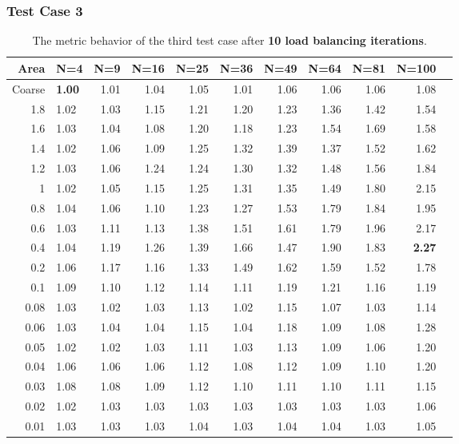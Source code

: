 \documentclass[compress]{beamer}
\begin{document}
\begin{frame}[t]\frametitle{Test Case 3}
\begin{table}[H]
\tiny
\centering
\caption{The metric behavior of the third test case after \textbf{10 load balancing iterations}.} 
\begin{tabular}{rlrrrrrrrrr}
  \hline
  Area & N=4 & N=9 & N=16 & N=25 & N=36 & N=49 & N=64 & N=81 & N=100 \\ 
  \hline
 Coarse & \textbf{\cellcolor{blue!25}1.00} & 1.01 & 1.04 & 1.05 & 1.01 & 1.06 & 1.06 & 1.06 & 1.08 \\ 
1.8 & 1.02 & 1.03 & 1.15 & 1.21 & 1.20 & 1.23 & 1.36 & 1.42 & 1.54 \\ 
  1.6 & 1.03 & 1.04 & 1.08 & 1.20 & 1.18 & 1.23 & 1.54 & 1.69 & 1.58 \\ 
1.4 & 1.02 & 1.06 & 1.09 & 1.25 & 1.32 & 1.39 & 1.37 & 1.52 & 1.62 \\ 
 1.2 & 1.03 & 1.06 & 1.24 & 1.24 & 1.30 & 1.32 & 1.48 & 1.56 & 1.84 \\ 
 1 & 1.02 & 1.05 & 1.15 & 1.25 & 1.31 & 1.35 & 1.49 & 1.80 & 2.15 \\ 
 0.8 & 1.04 & 1.06 & 1.10 & 1.23 & 1.27 & 1.53 & 1.79 & 1.84 & 1.95 \\ 
 0.6 & 1.03 & 1.11 & 1.13 & 1.38 & 1.51 & 1.61 & 1.79 & 1.96 & 2.17 \\ 
   0.4 & 1.04 & 1.19 & 1.26 & 1.39 & 1.66 & 1.47 & 1.90 & 1.83 & \textbf{\cellcolor{blue!25}2.27} \\ 
   0.2 & 1.06 & 1.17 & 1.16 & 1.33 & 1.49 & 1.62 & 1.59 & 1.52 & 1.78 \\ 
 0.1 & 1.09 & 1.10 & 1.12 & 1.14 & 1.11 & 1.19 & 1.21 & 1.16 & 1.19 \\ 
 0.08 & 1.03 & 1.02 & 1.03 & 1.13 & 1.02 & 1.15 & 1.07 & 1.03 & 1.14 \\ 
  0.06 & 1.03 & 1.04 & 1.04 & 1.15 & 1.04 & 1.18 & 1.09 & 1.08 & 1.28 \\ 
   0.05 & 1.02 & 1.02 & 1.03 & 1.11 & 1.03 & 1.13 & 1.09 & 1.06 & 1.20 \\ 
   0.04 & 1.06 & 1.06 & 1.06 & 1.12 & 1.08 & 1.12 & 1.09 & 1.10 & 1.20 \\ 
 0.03 & 1.08 & 1.08 & 1.09 & 1.12 & 1.10 & 1.11 & 1.10 & 1.11 & 1.15 \\ 
0.02 & 1.02 & 1.03 & 1.03 & 1.03 & 1.03 & 1.03 & 1.03 & 1.03 & 1.06 \\ 
 0.01 & 1.03 & 1.03 & 1.03 & 1.04 & 1.03 & 1.04 & 1.04 & 1.03 & 1.05 \\ 
   \hline
\end{tabular}
\end{table}
\end{frame}
\end{document}

